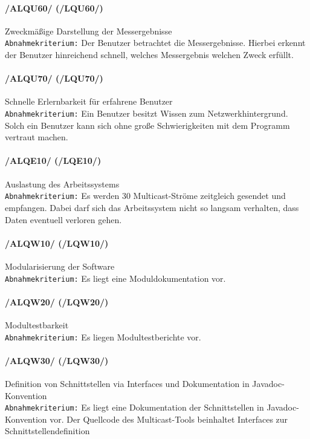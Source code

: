 \paragraph{/ALQU60/ (/LQU60/)} Zweckmäßige Darstellung der Messergebnisse\\
\texttt{Abnahmekriterium:} Der Benutzer betrachtet die
Messergebnisse. Hierbei erkennt der Benutzer hinreichend schnell,
welches Messergebnis welchen Zweck erfüllt.\\

\paragraph{/ALQU70/ (/LQU70/)} Schnelle Erlernbarkeit für erfahrene Benutzer\\
\texttt{Abnahmekriterium:} Ein Benutzer besitzt Wissen zum Netzwerkhintergrund.
Solch ein Benutzer kann sich ohne große Schwierigkeiten mit dem
Programm vertraut machen.\\

\paragraph{/ALQE10/ (/LQE10/)} Auslastung des Arbeitssystems\\
\texttt{Abnahmekriterium:} Es werden 30 Multicast-Ströme zeitgleich
gesendet und empfangen. Dabei darf sich das Arbeitssystem nicht
so langsam verhalten, dass Daten eventuell verloren gehen.\\

\paragraph{/ALQW10/ (/LQW10/)} Modularisierung der Software\\
\texttt{Abnahmekriterium:} Es liegt eine Moduldokumentation vor.\\

\paragraph{/ALQW20/ (/LQW20/)} Modultestbarkeit\\
\texttt{Abnahmekriterium:} Es liegen Modultestberichte vor.\\

\paragraph{/ALQW30/ (/LQW30/)} Definition von Schnittstellen via Interfaces
und Dokumentation in Javadoc-Konvention\\
\texttt{Abnahmekriterium:} Es liegt eine Dokumentation der
Schnittstellen in Javadoc-Konvention vor. Der Quellcode des
Multicast-Tools beinhaltet Interfaces zur
Schnittstellendefinition\\

